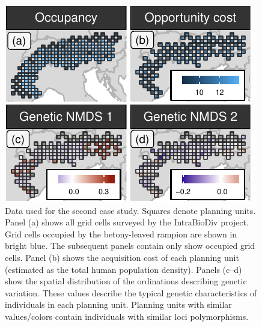 \begin{figure}
\centering
\includegraphics{figures_files/figure-latex/unnamed-chunk-9-1.pdf}
\caption{Data used for the second case study. Squares denote planning
units. Panel (a) shows all grid cells surveyed by the IntraBioDiv
project. Grid cells occupied by the betony-leaved rampion are shown in
bright blue. The subsequent panels contain only show occupied grid
cells. Panel (b) shows the acquisition cost of each planning unit
(estimated as the total human population density). Panels (c--d) show
the spatial distribution of the ordinations describing genetic
variation. These values describe the typical genetic characteristics of
individuals in each planning unit. Planning units with similar
values/colors contain individuals with similar loci polymorphisms.}
\end{figure}

